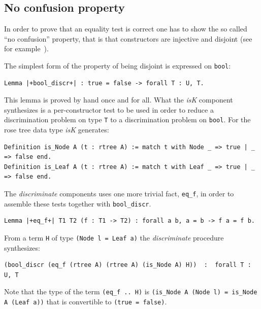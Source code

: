 \documentclass[a4paper,UKenglish,cleveref, autoref]{lipics-v2019}
\newcommand{\derive}[1]{\emph{#1}}
\begin{document}
\subsection{No confusion property} %

In order to prove that an equality test is correct
one has to show the so called ``no confusion'' property, that is that
constructors are injective and disjoint (see for
example~\cite{10.1007/11617990_12}).

The simplest form of the property of being disjoint is expressed on \lstinline+bool+:

\begin{lstlisting}
Lemma |+bool_discr+| : true = false -> forall T : U, T.
\end{lstlisting}

\noindent
This lemma is proved by hand once and for all. What the \derive{isK}
component synthesizes is a per-constructor test to be used in order
to reduce a discrimination problem on type \lstinline+T+ to a
discrimination problem on \lstinline+bool+. For the rose tree data
type \derive{isK} generates:

\begin{lstlisting}
Definition is_Node A (t : rtree A) := match t with Node _ => true | _ => false end.
Definition is_Leaf A (t : rtree A) := match t with Leaf _ => true | _ => false end.
\end{lstlisting}

\noindent
The \derive{discriminate} components uses one more trivial fact,
\lstinline+eq_f+, in order to assemble these tests together
with \lstinline+bool_discr+.

\begin{lstlisting}
Lemma |+eq_f+| T1 T2 (f : T1 -> T2) : forall a b, a = b -> f a = f b.
\end{lstlisting}

\noindent
From a term \lstinline+H+ of type 
\lstinline+(Node l = Leaf a)+ the \derive{discriminate} procedure
synthesizes:

\begin{lstlisting}
(bool_discr (eq_f (rtree A) (rtree A) (is_Node A) H))  :  forall T : U, T
\end{lstlisting}

\noindent
Note that the type of the term \lstinline+(eq_f .. H)+ is
\lstinline+(is_Node A (Node l) = is_Node A (Leaf a))+
that is convertible to \lstinline+(true = false)+.
\\
\end{document}
